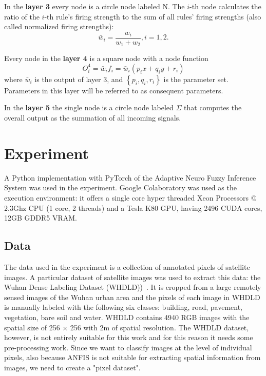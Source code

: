 \documentclass[10pt,twocolumn,letterpaper]{article}
\begin{document}
In the \textbf{layer 3} every node is a circle node labeled $\mathrm{N}$. The $i$-th node calculates the ratio of the $i$-th rule's firing strength to the sum of all rules' firing strengths (also called normalized firing strengths):
$$
\bar{w}_{i}=\frac{w_{i}}{w_{1}+w_{2}}, i=1,2 .
$$

Every node in the \textbf{layer 4} is a square node with a node function
$$
O_{i}^{4}=\bar{w}_{i} f_{i}=\bar{w}_{i}\left(p_{i} x+q_{i} y+r_{i}\right)
$$
where $\bar{w}_{i}$ is the output of layer 3, and $\left\{p_{i}, q_{i}, r_{i}\right\}$ is the parameter set. Parameters in this layer will be referred to as consequent parameters.

In the \textbf{layer 5} the single node is a circle node labeled $\Sigma$ that computes the overall output as the summation of all incoming signals.

\section{Experiment}

A Python implementation with PyTorch of the Adaptive Neuro Fuzzy Inference System was used in the experiment. Google Colaboratory was used as the execution environment: it offers a single core hyper threaded Xeon Processors @ 2.3Ghz CPU (1 core, 2 threads) and a Tesla K80 GPU, having 2496 CUDA cores, 12GB GDDR5 VRAM.

\subsection{Data}

The data used in the experiment is a collection of annotated pixels of satellite images.
A particular dataset of satellite images was used to extract this data: the Wuhan Dense Labeling Dataset (WHDLD))~\cite{WHDLD}. It is cropped from a large remotely sensed images of the Wuhan urban area and the pixels of each image in WHDLD is manually labeled with the following six classes: building, road, pavement, vegetation, bare soil and water. WHDLD contains 4940 RGB images with the spatial size of 256 × 256 with 2m of spatial resolution. 
The WHDLD dataset, however, is not entirely suitable for this work and for this reason it needs some pre-processing work. Since we want to classify images at the level of individual pixels, also because ANFIS is not suitable for extracting spatial information from images, we need to create a "pixel dataset".
\end{document}
